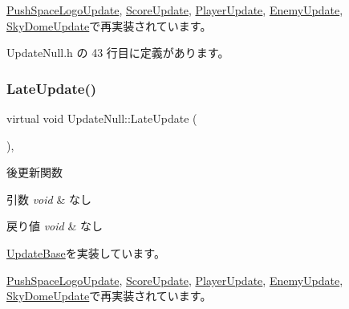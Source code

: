 \mbox{\hyperlink{class_push_space_logo_update_a9c165604160c012b429c1db1d67ffb2a}{Push\+Space\+Logo\+Update}}, \mbox{\hyperlink{class_score_update_afd51e11ad00ebc15d9b3139398437afc}{Score\+Update}}, \mbox{\hyperlink{class_player_update_ac72b39db7b7bfaf094bde9ed1adef4b7}{Player\+Update}}, \mbox{\hyperlink{class_enemy_update_a5b68696e964f71fca73c9143e3770c9d}{Enemy\+Update}}, \mbox{\hyperlink{class_sky_dome_update_ab4fec6d13590c07e39e6e8b4f7f7613a}{Sky\+Dome\+Update}}で再実装されています。



 Update\+Null.\+h の 43 行目に定義があります。

\mbox{\label{class_update_null_ac68da1ba7f3fbcae833442bb1c169200}} 
\subsubsection{\texorpdfstring{Late\+Update()}{LateUpdate()}}
{\footnotesize\ttfamily virtual void Update\+Null\+::\+Late\+Update (\begin{DoxyParamCaption}{ }\end{DoxyParamCaption})\hspace{0.3cm}{\ttfamily [inline]}, {\ttfamily [virtual]}}



後更新関数 


\begin{DoxyParams}{引数}
{\em void} & なし \\
\hline
\end{DoxyParams}

\begin{DoxyRetVals}{戻り値}
{\em void} & なし \\
\hline
\end{DoxyRetVals}


\mbox{\hyperlink{class_update_base_afc4956f78135aed5fc4e4f9991be50b9}{Update\+Base}}を実装しています。



\mbox{\hyperlink{class_push_space_logo_update_a4423864fb22b1211e92a4317d0b70a44}{Push\+Space\+Logo\+Update}}, \mbox{\hyperlink{class_score_update_adc9a48f54828e49c072c298777935893}{Score\+Update}}, \mbox{\hyperlink{class_player_update_ae376f517f3458edfef61ac366aa78e36}{Player\+Update}}, \mbox{\hyperlink{class_enemy_update_ae14e4ebb42ad9043534e53edcba5b242}{Enemy\+Update}}, \mbox{\hyperlink{class_sky_dome_update_a94347cb50b4dc13528738a7b812da261}{Sky\+Dome\+Update}}で再実装されています。



